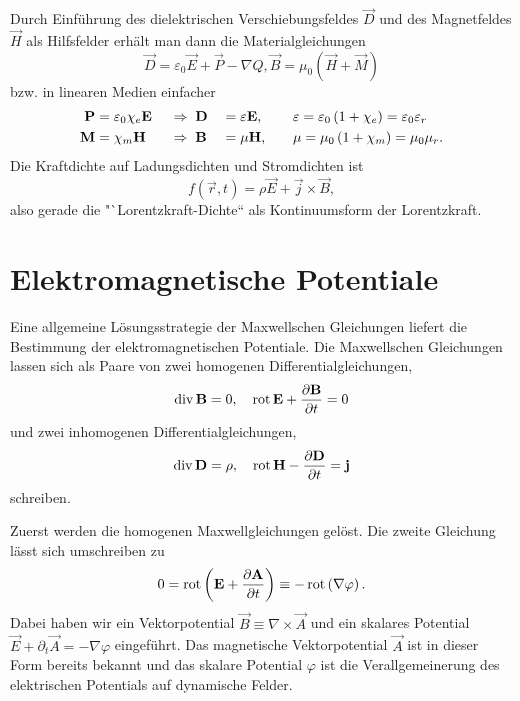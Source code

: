 Durch Einführung des dielektrischen Verschiebungsfeldes $\vec {D}$ und des Magnetfeldes $\vec {H}$ als Hilfsfelder erhält man dann die Materialgleichungen
\begin{equation*}
	\vec {D}=\varepsilon _{0}\vec {E}+\vec {P}-\nabla Q, \vec {B}=\mu _{0}\left(\vec {H}+\vec {M}\right)
\end{equation*}
bzw. in linearen Medien einfacher
\begin{alignat*}{4}
	\mathbf{P} & =\varepsilon _{0}\chi _{e}\mathbf{E} &  & \;\Rightarrow\; \mathbf{D} &  & =\varepsilon \mathbf{E},\quad &  & \varepsilon =\varepsilon _{0}\left(1+\chi _{e}\right)=\varepsilon _{0}\varepsilon _{r} \\
	\mathbf{M} & =\chi _{m}\mathbf{H}                 &  & \;\Rightarrow\; \mathbf{B} &  & =\mu \mathbf{H},\quad         &  & \mu =\mu _{0}\left(1+\chi _{m}\right)=\mu _{0}\mu _{r}.
\end{alignat*}
Die Kraftdichte auf Ladungsdichten und Stromdichten ist
\begin{equation*}
	f\left(\vec {r},t\right)=\rho \vec {E}+\vec {j}\times \vec {B},
\end{equation*}
also gerade die "`Lorentzkraft-Dichte`` als Kontinuumsform der Lorentzkraft.



\section{Elektromagnetische Potentiale\label{sec:elektromagnetische_potentiale}}

Eine allgemeine Lösungsstrategie der Maxwellschen Gleichungen liefert die Bestimmung der elektromagnetischen Potentiale. Die Maxwellschen Gleichungen lassen sich als Paare von zwei homogenen Differentialgleichungen,
\begin{equation*}
	\operatorname{div} \mathbf{B}=0, \quad\operatorname{rot} \mathbf{E}+\frac{\partial \mathbf{B}}{\partial t}=0
\end{equation*}
und zwei inhomogenen Differentialgleichungen,
\begin{equation*}
	\operatorname{div} \mathbf{D}=\rho ,\quad \operatorname{rot} \mathbf{H}-\frac{\partial \mathbf{D}}{\partial t}=\mathbf{j}
\end{equation*}
schreiben.

Zuerst werden die homogenen Maxwellgleichungen gelöst. Die zweite Gleichung lässt sich umschreiben zu
\begin{equation*}
	0=\operatorname{rot} \left(\mathbf{E}+\frac{\partial \mathbf{A}}{\partial t}\right)\equiv -\operatorname{rot} \left(\nabla \varphi \right).
\end{equation*}
Dabei haben wir ein Vektorpotential $\vec {B}\equiv \nabla \times \vec {A}$ und ein skalares Potential $\vec {E}+\partial _{t}\vec {A}=-\nabla \varphi $ eingeführt. Das magnetische Vektorpotential $\vec {A}$ ist in dieser Form bereits bekannt und das skalare Potential $\varphi $ ist die Verallgemeinerung des elektrischen Potentials auf dynamische Felder.

